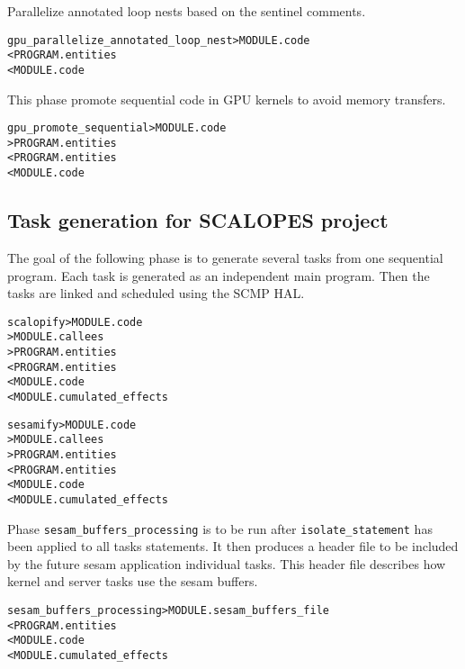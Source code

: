 \documentclass[a4paper]{report}
\newenvironment{PipsMake}{\begin{alltt}}{\end{alltt}}
\newenvironment{PipsPass}[1]{\label{pass:#1}}{}
\begin{document}
\begin{PipsPass}{gpu_parallelize_annotated_loop_nest}
Parallelize annotated loop nests based on the sentinel comments.
\end{PipsPass}

\begin{PipsMake}
gpu_parallelize_annotated_loop_nest        > MODULE.code
        < PROGRAM.entities
        < MODULE.code

\end{PipsMake}



\begin{PipsPass}{gpu_promote_sequential}
This phase promote sequential code in GPU kernels to avoid memory transfers.
\end{PipsPass}

\begin{PipsMake}
gpu_promote_sequential	> MODULE.code
		> PROGRAM.entities
		< PROGRAM.entities
		< MODULE.code
\end{PipsMake}


\subsection{Task generation for SCALOPES project}
\label{subsubsection-scalopes-project}

The goal of the following phase is to generate several tasks from one
sequential program. Each task is generated as an independent main
program. Then the tasks are linked and scheduled using the SCMP HAL.

\begin{PipsMake}
scalopify                    > MODULE.code
		> MODULE.callees
		> PROGRAM.entities
		< PROGRAM.entities
		< MODULE.code
                < MODULE.cumulated_effects
\end{PipsMake}
\begin{PipsMake}
sesamify                    > MODULE.code
		> MODULE.callees
		> PROGRAM.entities
		< PROGRAM.entities
		< MODULE.code
                < MODULE.cumulated_effects
\end{PipsMake}

\begin{PipsPass}{sesam_buffers_processing}
Phase \texttt{sesam\_buffers\_processing} is to be run after
\texttt{isolate\_statement} has been applied to all tasks
statements. It then produces a header file to be included by the
future sesam application individual tasks. This header file describes
how kernel and server tasks use the sesam buffers.
\end{PipsPass}
\begin{PipsMake}
sesam_buffers_processing    > MODULE.sesam_buffers_file
              < PROGRAM.entities
              < MODULE.code
              < MODULE.cumulated_effects
\end{PipsMake}
\end{document}
